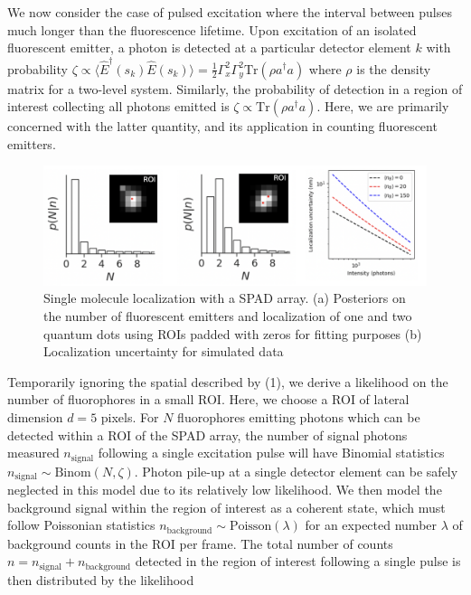 \documentclass[a4paper, twocolumn, superscriptaddress,prl]{revtex4}  %
\begin{document}
We now consider the case of pulsed excitation where the interval between pulses much longer than the fluorescence lifetime. Upon excitation of an isolated fluorescent emitter, a photon is detected at a particular detector element $k$ with probability $\zeta\propto \langle \hat{E}^{\dagger}(s_k)\hat{E}(s_k)\rangle = \frac{1}{2}\Gamma_{x}^2 \Gamma_{y}^2\mathrm{Tr}(\rho a^{\dagger}a)$ where $\rho$ is the density matrix for a two-level system. Similarly, the probability of detection in a region of interest collecting all photons emitted is $\zeta\propto \mathrm{Tr}(\rho a^{\dagger}a)$. Here, we are primarily concerned with the latter quantity, and its application in counting fluorescent emitters.

\begin{figure}
\includegraphics[width=15cm]{Figure-4.png}
\caption{Single molecule localization with a SPAD array. (a) Posteriors on the number of fluorescent emitters and localization of one and two quantum dots using ROIs padded with zeros for fitting purposes (b) Localization uncertainty for simulated data}
\end{figure}   

Temporarily ignoring the spatial described by (1), we derive a likelihood on the number of fluorophores in a small ROI. Here, we choose a ROI of lateral dimension $d = 5$ pixels. For $N$ fluorophores emitting photons which can be detected within a ROI of the SPAD array, the number of signal photons measured $n_{\mathrm{signal}}$ following a single excitation pulse will have Binomial statistics $n_{\mathrm{signal}} \sim \mathrm{Binom}(N,\zeta)$. Photon pile-up at a single detector element can be safely neglected in this model due to its relatively low likelihood. We then model the background signal within the region of interest as a coherent state, which must follow Poissonian statistics $n_{\mathrm{background}} \sim \mathrm{Poisson}(\lambda)$ for an expected number $\lambda$ of background counts in the ROI per frame. The total number of counts $n=n_{\mathrm{signal}}+n_{\mathrm{background}}$ detected in the region of interest following a single pulse is then distributed by the likelihood
\end{document}
